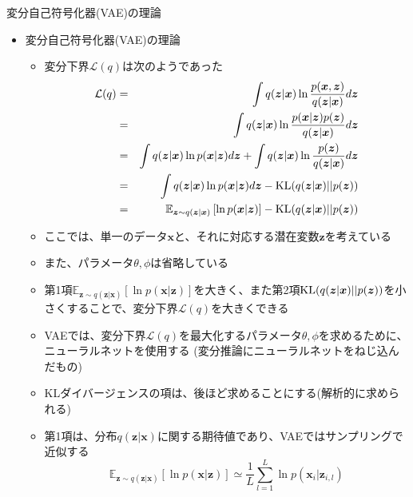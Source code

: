 \documentclass[dvipdfmx,notheorems,t]{beamer}
\begin{document}
\begin{frame}{変分自己符号化器(VAE)の理論}

\begin{itemize}
	\item 変分自己符号化器(VAE)の理論
	\begin{itemize}
		\item 変分下界$\mathcal{L}(q)$は次のようであった
		\begin{eqnarray}
			\mathcal{L}(q) &=& \int q(\bm{z} | \bm{x}) \ln \frac{p(\bm{x}, \bm{z})}{q(\bm{z} | \bm{x})} d\bm{z} \\
			&=& \int q(\bm{z} | \bm{x}) \ln \frac{p(\bm{x} | \bm{z}) p(\bm{z})}{q(\bm{z} | \bm{x})} d\bm{z} \\
			&=& \int q(\bm{z} | \bm{x}) \ln p(\bm{x} | \bm{z}) d\bm{z} + \int q(\bm{z} | \bm{x}) \ln \frac{p(\bm{z})}{q(\bm{z} | \bm{x})} d\bm{z} \\
			&=& \int q(\bm{z} | \bm{x}) \ln p(\bm{x} | \bm{z}) d\bm{z} - \operatorname{KL}(q(\bm{z} | \bm{x}) || p(\bm{z})) \\
			&=& \mathbb{E}_{\bm{z} \sim q(\bm{z} | \bm{x})} \left[ \ln p(\bm{x} | \bm{z}) \right] - \operatorname{KL}(q(\bm{z} | \bm{x}) || p(\bm{z}))
		\end{eqnarray}
		
		\item ここでは、単一のデータ$\bm{x}$と、それに対応する潜在変数$\bm{z}$を考えている
		\item また、パラメータ$\theta, \phi$は省略している
		\newline
		
		\item \alert{第1項}$\mathbb{E}_{\bm{z} \sim q(\bm{z} | \bm{x})} \left[ \ln p(\bm{x} | \bm{z}) \right]$を\alert{大きく}、また\alert{第2項}$\operatorname{KL}(q(\bm{z} | \bm{x}) || p(\bm{z}))$を\alert{小さく}することで、変分下界$\mathcal{L}(q)$を大きくできる
		\newline
		\item VAEでは、変分下界$\mathcal{L}(q)$を最大化するパラメータ$\theta, \phi$を求めるために、ニューラルネットを使用する (変分推論にニューラルネットをねじ込んだもの)
		\newline
		
		\item KLダイバージェンスの項は、後ほど求めることにする(解析的に求められる)
		\item 第1項は、分布$q(\bm{z} | \bm{x})$に関する期待値であり、VAEでは\alert{サンプリングで近似}する
		\begin{equation}
			\mathbb{E}_{\bm{z} \sim q(\bm{z} | \bm{x})} \left[ \ln p(\bm{x} | \bm{z}) \right] \simeq \frac{1}{L} \sum_{l = 1}^L \ln p(\bm{x}_i | \bm{z}_{i, l})
		\end{equation}
		

\end{itemize}
\end{itemize}
\end{frame}
\end{document}

